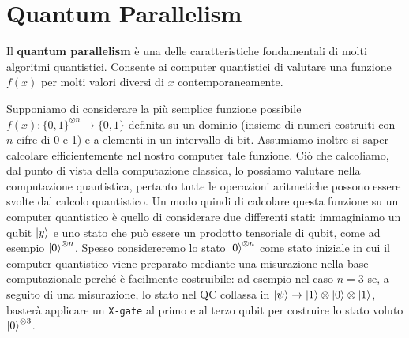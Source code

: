 
\vspace{1cm}

\noindent {}

\section{Quantum Parallelism}

\begin{definizione}
    Il \textbf{quantum parallelism} è una delle caratteristiche fondamentali di molti algoritmi quantistici. Consente ai computer quantistici di valutare una funzione $f(x)$ per molti valori diversi di $x$ contemporaneamente.
\end{definizione}
\noindent Supponiamo di considerare la più semplice funzione possibile $f(x):\{0,1\}^{\otimes n} \rightarrow \{0,1\}$ definita su un dominio (insieme di numeri costruiti con $n$ cifre di 0 e 1) e a elementi in un intervallo di bit. Assumiamo inoltre si saper calcolare efficientemente nel nostro computer tale funzione. Ciò che calcoliamo, dal punto di vista della computazione classica, lo possiamo valutare nella computazione quantistica, pertanto tutte le operazioni aritmetiche possono essere svolte dal calcolo quantistico. Un modo quindi di calcolare questa funzione su un computer quantistico è quello di considerare due differenti stati: immaginiamo un qubit $\ket{y}$ e uno stato che può essere un prodotto tensoriale di qubit, come ad esempio $\ket{0}^{\otimes n}$. Spesso considereremo lo stato $\ket{0}^{\otimes n}$ come stato iniziale in cui il computer quantistico viene preparato mediante una misurazione nella base computazionale perché è facilmente costruibile: ad esempio nel caso $n=3$ se, a seguito di una misurazione, lo stato nel QC collassa in $\ket{\psi} \rightarrow \ket{1} \otimes \ket{0} \otimes \ket{1}$, basterà applicare un \texttt{X-gate} al primo e al terzo qubit per costruire lo stato voluto $\ket{0}^{\otimes 3}$.

